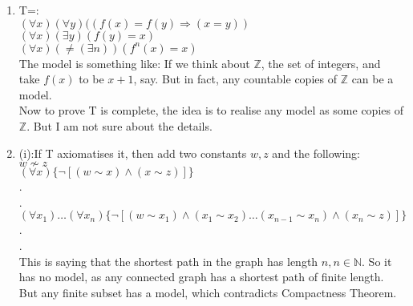 \begin{enumerate}
\item T=:\\
      $(\forall x)(\forall y)((f(x)=f(y) \Rightarrow (x=y))$\\
      $(\forall x)(\exists y)(f(y)=x)$\\
      $(\forall x)(\neq (\exists n))(f^n(x)=x)$\\
      The model is something like: If we think about $\mathbb{Z}$, the set of integers, and take $f(x)$ to be $x+1$, say. But in fact, any countable copies of $\mathbb{Z}$ can be a model.\\
      Now to prove T is complete, the idea is to realise any model as some copies of $\mathbb{Z}$. But I am not sure about the details.\\
\item (i):If T axiomatises it, then add two constants $w,z$ and the
      following:\\
      $w \not \sim z$\\
      $(\forall x)\{\neg[(w \sim x) \wedge (x \sim z)]\}$\\
      .\\
      .\\
      $(\forall x_1) \ldots (\forall x_n)\{\neg[(w \sim x_1) \wedge (x_1 \sim x_2) \ldots (x_{n-1} \sim x_n) \wedge (x_n \sim z)]\}$\\
      .\\
      .\\
      This is saying that the shortest path in the graph has length $n, n \in \mathbb{N}$. So it has no model, as any connected graph has a shortest path of finite length. But any finite subset has a model, which contradicts Compactness Theorem.\\
\end{enumerate}
